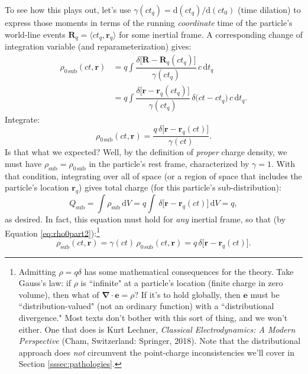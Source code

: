 \documentclass[12pt]{article}
\renewcommand{\vv}[1]{\mathbf{#1}}
\newcommand{\dd}[1]{\mathrm{d}#1}
\newcommand{\del}{\boldsymbol{\nabla}}
\begin{document}
To see how this plays out, let's use $\gamma(ct_q) = \dd (ct_q) / \dd (ct_0)$ (time dilation) to express those moments in terms of the running \emph{coordinate} time of the particle's world-line events $\vv R_q = \langle ct_q, \vv r_q \rangle$ for some inertial frame. A corresponding change of integration variable (and reparameterization) gives:
\begin{equation*}
\begin{aligned}
\rho_{0 \, \mathrm{sub}} (ct, \vv r) &= q \int \dfrac{\delta \big[ \vv R - \vv R_q (ct_q) \big]}{\gamma (ct_q)} \, c \, \dd t_q \\[3pt]
&= q \int \dfrac{\delta \big[ \vv r - \vv r_q (ct_q) \big]}{\gamma (ct_q)} \, \delta \big( ct - ct_q \big) \, c \, \dd t_q .
\end{aligned}
\end{equation*}
Integrate:
\begin{equation}\label{eq:rho0part2}
\rho_{0 \, \mathrm{sub}} (ct, \vv r) = \dfrac{q \, \delta \big[ \vv r - \vv r_q (ct) \big]}{\gamma (ct)}.
\end{equation}
Is that what we expected? Well, by the definition of \emph{proper} charge density, we must have $\rho_{\mathrm{sub}} = \rho_{0 \, \mathrm{sub}}$ in the particle's rest frame, characterized by $\gamma = 1$. With that condition, integrating over all of space (or a region of space that includes the particle's location $\vv r_q$) gives total charge (for this particle's sub-distribution):
\begin{equation*}
Q_{\mathrm{sub}} = \int  \rho_{\mathrm{sub}} \, \dd V = q \int \, \delta \big[ \vv r - \vv r_q (ct) \big] \, \dd V = q ,
\end{equation*}
as desired. In fact, this equation must hold for \emph{any} inertial frame, so that (by Equation \ref{eq:rho0part2}):\footnote{Admitting $\rho = q \delta$ has some mathematical consequences for the theory. Take Gauss's law: if $\rho$ is ``infinite" at a particle's location (finite charge in zero volume), then what of $\del \cdot \vv e = \rho$? If it's to hold globally, then $\vv e$ must be ``distribution-valued" (not an ordinary function) with a ``distributional divergence." Most texts don't bother with this sort of thing, and we won't either. One that does is Kurt Lechner, \emph{Classical Electrodynamics: A Modern Perspective} (Cham, Switzerland: Springer, 2018). Note that the distributional approach does \emph{not} circumvent the point-charge inconsistencies we'll cover in Section \ref{sssec:pathologies}.}
\begin{equation}\label{eq:rhopart}
\rho_{\mathrm{sub}} (ct, \vv r) = \gamma (ct) \, \rho_{0 \, \mathrm{sub}} (ct, \vv r) = q \, \delta \big[ \vv r - \vv r_q (ct) \big] .
\end{equation}
\end{document}
